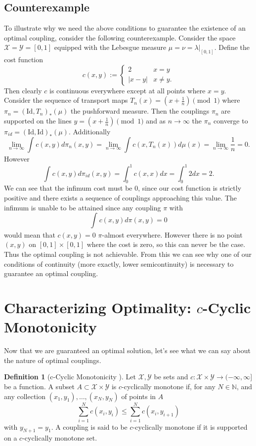 \documentclass[11pt]{amsart}
\theoremstyle{definition}                  %
\newtheorem{definition}[theorem]{Definition}
\theoremstyle{remark}                      %
\begin{document}
\subsection{Counterexample}
To illustrate why we need the above conditions to guarantee the existence of an optimal coupling, consider the following counterexample.
Consider the space $ \mathcal{X} = \mathcal{Y} = [0,1]$ equipped with the Lebesgue measure $\mu = \nu = \lambda|_{[0,1]}$.
Define the cost function
\[
c(x,y) :=
\begin{cases}
    2 & x = y\\
    |x-y| & x \neq y.
\end{cases}
\] 
Then clearly $c$ is continuous everywhere except at all points where $x = y$.
Consider the sequence of transport maps  $T_n(x) = (x + \frac{1}{n}) \pmod 1$ where $\pi_n = (\mathrm{Id}, T_n)_*(\mu) $ the pushforward measure.
Then the couplings $\pi_n$ are supported on the lines $y = (x + \frac{1}{n}) \pmod 1$ and as $n \to \infty$
the $\pi_n$ converge to $\pi_{id} = (\mathrm{Id},\mathrm{Id})_*(\mu)$. Additionally
\[
\lim_{n\to \infty} \int_{}^{}c(x,y) d\pi_n(x,y) = \lim_{n\to \infty} \int_{}^{} c(x, T_n(x)) d \mu(x) = \lim_{n\to \infty} \frac{1}{n} = 0.
\] 
However
\[
    \int_{}^{}c(x,y) d \pi_{id}(x,y) = \int_{0}^{1} c(x,x) dx = \int_{0}^{1} 2 dx = 2.
\] 
We can see that the infimum cost must be 0, since our cost function is strictly positive and there exists a sequence of couplings approaching this value.
The infimum is unable to be attained since any coupling $\pi$ with
\[
\int_{}^{}c(x,y) d\pi(x,y) = 0
\] 
would mean that $c(x,y) = 0$  $\pi$-almost everywhere. However there is no point $(x,y)$ on  $[0,1] \times [0,1]$ where the cost is zero, so this can never be the case.
Thus the optimal coupling is not achievable. From this we can see why one of our conditions of continuity (more exactly, lower semicontinuity) is necessary to guarantee an optimal coupling.


\section{Characterizing Optimality: $c$-Cyclic Monotonicity}\label{section:cm}
Now that we are guaranteed an optimal solution, let's see what we can say about the nature of optimal couplings.

\begin{definition}[c-Cyclic Monotonicity \citep{villani2008ot}]
    Let $ \mathcal{X}, \mathcal{Y}$ be sets and $c : \mathcal{X} \times \mathcal{Y} \rightarrow (-\infty, \infty]$ be a function.
    A subset $A \subset \mathcal{X} \times \mathcal{Y}$ is $c$-cyclically monotone if, for
    any $N \in \mathbb{N}$, and any collection $(x_1,y_1), \dots, (x_N, y_N)$ of points in $A$
     \[
         \sum_{i=1}^{N}c(x_i,y_i) \le \sum_{i=1}^{N}c(x_i,y_{i+1})
    \] 
    with $y_{N+1} = y_1$. A coupling is said to be $c$-cyclically monotone if it is supported on a $c$-cyclically monotone set.
\end{definition}
\end{document}
